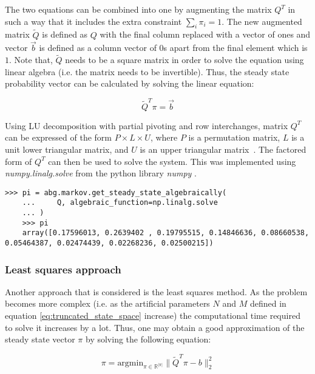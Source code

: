 The two equations can be combined into one by augmenting the matrix \( Q^T \)
in such a way that it includes the extra constraint \( \sum_i \pi_i = 1 \).
The new augmented matrix \(\tilde Q\) is defined as \(Q\) with the final
column replaced with a vector of ones and vector \(\vec{b}\) is defined
as a column vector of \(0\)s apart from the final element which is \(1\).
Note that, \(\tilde Q\) needs to be a square matrix in order to solve the
equation using linear algebra (i.e. the matrix needs to be invertible).
Thus, the steady state probability vector can be calculated by solving the
linear equation:

\begin{equation}
    \tilde Q^T \pi = \vec{b}
\end{equation}

Using LU decomposition with partial pivoting and row interchanges, matrix
\(Q^T\) can be expressed of the form \(P \times L \times U\), where \(P\) is
a permutation matrix, \(L\) is a unit lower triangular matrix, and \(U\) is
an upper triangular matrix~\cite{strang2006linear}.
The factored form of \(Q^T\) can then be used to solve the system.
This was implemented using \textit{numpy.linalg.solve} from the
python library \textit{numpy} \cite{2020NumPy-Array} \cite{lapack99}.


\begin{lstlisting}[style=pystyle]
    >>> pi = abg.markov.get_steady_state_algebraically(
    ...     Q, algebraic_function=np.linalg.solve
    ... )
    >>> pi
    array([0.17596013, 0.2639402 , 0.19795515, 0.14846636, 0.08660538, 0.05464387, 0.02474439, 0.02268236, 0.02500215])

\end{lstlisting}


\subsubsection{Least squares approach}

Another approach that is considered is the least squares method.
As the problem becomes more complex (i.e. as the artificial parameters \(N\)
and \(M\) defined in equation \ref{eq:truncated_state_space} increase)
the computational time required to solve it increases by a lot.
Thus, one may obtain a good approximation of the steady state vector \( \pi \)
by solving the following equation:

\begin{equation}
    \pi = \text{argmin}_{\pi \in \mathbb{R}^{|\pi|}}\|\tilde Q^T \pi - b\|_2^2
\end{equation}

